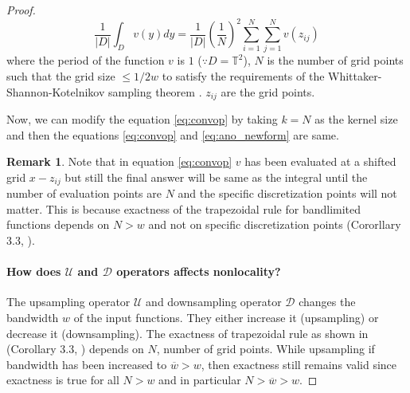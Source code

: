 \documentclass[reqno,10pt]{amsart}
\theoremstyle{plain}
\theoremstyle{definition}
\newtheorem{rem}{Remark}
\newcommand{\bb}[1]{\mathbb{#1}}
\newcommand{\cal}[1]{\mathcal{#1}}
\begin{document}
\begin{proof}
        \begin{equation}\label{eq:ano_newform}
            \frac{1}{|D|} \int_D v(y) dy = \frac{1}{|D|}\left(\frac{1}{N}\right)^2 \sum_{i=1}^{N} \sum_{j=1}^{N} v(z_{ij})
        \end{equation}
        where the period of the function $v$ is $1$ ($\because D =\bb T^2$), $N$ is the number of grid points such that the grid size $\leq 1/2w$ to satisfy the requirements of the Whittaker-Shannon-Kotelnikov sampling theorem \cite{MU2000}. $z_{ij}$ are the grid points.

        \noindent Now, we can modify the equation \ref{eq:convop} by taking $k=N$ as the kernel size and then the equations \ref{eq:convop} and \ref{eq:ano_newform} are same.
        
        \begin{rem}
            Note that in equation \ref{eq:convop} $v$ has been evaluated at a shifted grid $x-z_{ij}$ but still the final answer will be same as the integral until the number of evaluation points are $N$ and the specific discretization points will not matter. This is because exactness of the trapezoidal rule for bandlimited functions depends on $N >w$ and not on specific discretization points (Cororllary 3.3, \cite{LT2014}).
        \end{rem}
        \paragraph{\bf How does $\cal U$ and $\cal D$ operators affects nonlocality?} \label{par:1} The upsampling operator $\cal U$ and downsampling operator $\cal D$ changes the bandwidth $w$ of the input functions. They either increase it (upsampling) or decrease it (downsampling). The exactness of trapezoidal rule as shown in (Corollary 3.3, \cite{LT2014}) depends on $N$, number of grid points. While upsampling if bandwidth has been increased to $\overline{w} > w$, then exactness still remains valid since exactness is true for all $N > w$ and in particular $N > \overline{w} > w$.


\end{proof}
\end{document}
